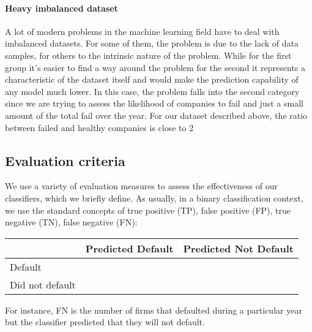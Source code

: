 \paragraph{Heavy imbalanced dataset}

A lot of modern problems in the machine learning field have to deal with imbalanced datasets. For some of them, the problem is due to the lack of data samples, for others to the intrinsic nature of the problem.
While for the first group it’s easier to find a way around the problem for the second it represents a characteristic of the dataset itself and would make the prediction capability of any model much lower. 
In this case, the problem falls into the second category since we are trying to assess the likelihood of companies to fail and just a small amount of the total fail over the year. For our dataset described above, the ratio between failed and healthy companies is close to 2%

\subsection{Evaluation criteria}
We use a variety of evaluation measures to assess the effectiveness of
our classifiers, which we briefly define. As usually, in a binary
classification context, we use the standard concepts of true positive
(TP), false positive (FP), true negative (TN), false negative (FN):
\medskip

\begin{center}
\begin{tabular}{|l|c|c|}
\hline
	& Predicted Default	& Predicted Not Default \\\hline
Default 	&\TP	&\FN	\\\hline
Did not default &\FP	&\TN	\\\hline
\end{tabular}
\end{center}
\medskip

For instance, FN is the number of firms that defaulted during a particular year but
the classifier predicted that they will not default.


